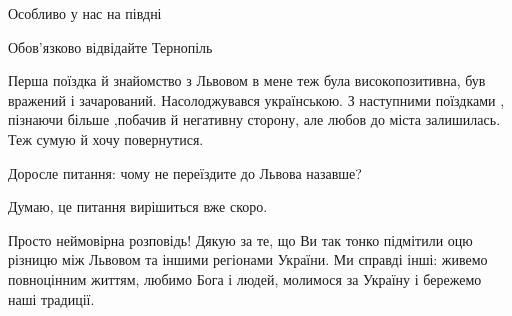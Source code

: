 \begin{itemize}
\begin{itemize}
Особливо у нас на півдні

\end{itemize}

 
Обов'язково відвідайте Тернопіль

 

Перша поїздка й знайомство з Львовом в мене теж була високопозитивна, був
вражений і зачарований. Насолоджувався українською. З наступними поїздками ,
пізнаючи більше ,побачив й негативну сторону, але любов до міста залишилась. Теж
сумую й хочу повернутися.


 
Доросле питання: чому не переїздите до Львова назавше?

\begin{itemize}
 
Думаю, це питання вирішиться вже скоро.
\end{itemize}

 

Просто неймовірна розповідь! Дякую за те, що Ви так тонко підмітили оцю різницю
між Львовом та іншими регіонами України. Ми справді інші: живемо повноцінним
життям, любимо Бога і людей, молимося за Україну і бережемо наші традиції.


\end{itemize}
